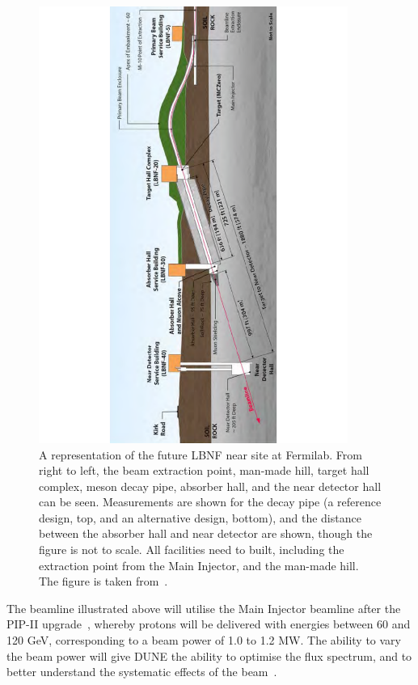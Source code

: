 \begin{figure}
  \centering
  \includegraphics[width=0.9\textwidth]{NearDetectorComplex}
  \caption[A representation of the future LBNF near site at Fermilab]
          {A representation of the future LBNF near site at Fermilab. From right to left, the beam extraction point, man-made hill, target hall complex, meson decay pipe, absorber hall, and the near detector hall can be seen. Measurements are shown for the decay pipe (a reference design, top, and an alternative design, bottom), and the distance between the absorber hall and near detector are shown, though the figure is not to scale. All facilities need to built, including the extraction point from the Main Injector, and the man-made hill. The figure is taken from~\citep{DUNECDR_V3}.}
  \label{fig:DUNENearDetectorComplex}
\end{figure}

The beamline illustrated above will utilise the Main Injector beamline after the PIP-II upgrade~\citep{PIP-II}, whereby protons will be delivered with energies between 60 and 120 GeV, corresponding to a beam power of 1.0 to 1.2 MW. The ability to vary the beam power will give DUNE the ability to optimise the flux spectrum, and to better understand the systematic effects of the beam~\citep{DUNECDR_V1}. \\

